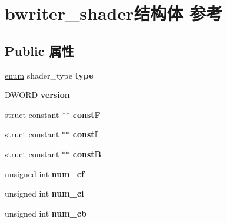 \hypertarget{structbwriter__shader}{}\section{bwriter\+\_\+shader结构体 参考}
\label{structbwriter__shader}
\subsection*{Public 属性}
\begin{DoxyCompactItemize}
\item 
\mbox{\label{structbwriter__shader_aafebccb44a31d248b970e85631900119}} 
\hyperlink{interfaceenum}{enum} shader\+\_\+type {\bfseries type}
\item 
\mbox{\label{structbwriter__shader_a68a9c42e8ff45d168bc00dd64340c73f}} 
D\+W\+O\+RD {\bfseries version}
\item 
\mbox{\label{structbwriter__shader_ac0a9e65eeeb1b042ac4132a8f9b77633}} 
\hyperlink{interfacestruct}{struct} \hyperlink{structconstant}{constant} $\ast$$\ast$ {\bfseries constF}
\item 
\mbox{\label{structbwriter__shader_a059c3096c4bf7eabad41480bd67cbdee}} 
\hyperlink{interfacestruct}{struct} \hyperlink{structconstant}{constant} $\ast$$\ast$ {\bfseries constI}
\item 
\mbox{\label{structbwriter__shader_abbcf053de7ee3659ce5f7b5168b5f2a2}} 
\hyperlink{interfacestruct}{struct} \hyperlink{structconstant}{constant} $\ast$$\ast$ {\bfseries constB}
\item 
\mbox{\label{structbwriter__shader_ac93c9d0069fe36ac37e8daf7f59e6cb0}} 
unsigned int {\bfseries num\+\_\+cf}
\item 
\mbox{\label{structbwriter__shader_aabd5c8f3b4f9b715929772b23946ea31}} 
unsigned int {\bfseries num\+\_\+ci}
\item 
\mbox{\label{structbwriter__shader_a23f29a9ddf6a8cfd48a9eda01b6034e2}} 
unsigned int {\bfseries num\+\_\+cb}
\item 
$$
\end{DoxyCompactItemize}
